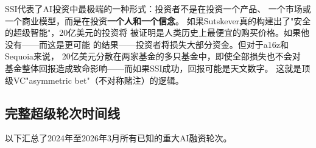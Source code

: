 SSI代表了AI投资中最极端的一种形式：投资者不是在投资一个产品、
一个市场或一个商业模型，而是在投资\textbf{一个人和一个信念}。
如果Sutskever真的构建出了"安全的超级智能"，20亿美元的投资将
被证明是人类历史上最便宜的购买价格。如果他没有——而这是更可能
的结果——投资者将损失大部分资金。但对于a16z和Sequoia来说，
20亿美元分散在两家基金的多只基金中，即使全部损失也不会对
基金整体回报造成致命影响——而如果SSI成功，回报可能是天文数字。
这就是顶级VC"asymmetric bet"（不对称赌注）的逻辑。

\subsection{完整超级轮次时间线}
\label{subsec:fund-megaround-timeline}

以下汇总了2024年至2026年3月所有已知的重大AI融资轮次。

